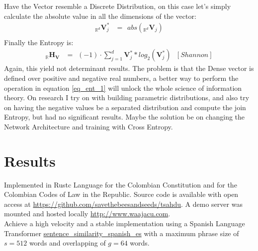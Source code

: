 \documentclass[a4paper,fleqn]{cas-sc}
\begin{document}
\noindent
Have the Vector resemble a Discrete Distribution, on this case let's simply calculate the absolute value in all the dimensions of the vector: 
\begin{equation}\label{eq_ent_1}
  \begin{split}
    {}_{\mathbb{R}^{d}}\mathbf{V}^{*}_{j}&=\hspace{5pt}abs({}_{\mathbb{R}^{d}}\mathbf{V}_{j})\\
  \end{split}
\end{equation}
Finally the Entropy is: \\
\begin{equation}
  \begin{split}
    _{\mathbb{R}}\mathbf{H}_{\mathbf{V}}&=\hspace{5pt} (-1) \cdot{}\sum_{j=1}^{d}\mathbf{V}^{*}_{j}*log_{2}(\mathbf{V}^{*}_{j})\hspace{8pt} [Shannon]  
  \end{split}
\end{equation}
Again, this yield \color{brown}not determinant results\color{black}. The problem is that the Dense vector is defined over positive and negative real numbers, 
a better way to perform the operation in equation \ref{eq_ent_1} will unlock the whole science of information theory. On research I try on with building 
parametric distributions, and also try on having the negative values be a separated distribution and compute the join Entropy, but had no significant results. 
Maybe the solution be on changing the Network Architecture and training with Cross Entropy. 

\newpage
\section{Results}
Implemented in Rustc Language for the Colombian Constitution and for the Colombian Codes of Law in the Republic. 
Source code is available with open access at \href{https://github.com/savethebeesandseeds/tsahdu}{https://github.com/savethebeesandseeds/tsahdu}. 
A demo server was mounted and hosted locally \href{http://www.waajacu.com}{http://www.waajacu.com}. \\

Achieve a high velocity and a stable implementation 
using a Spanish Language Transformer \href{https://huggingface.co/hiiamsid/sentence_similarity_spanish_es}{sentence\_similarity\_spanish\_es} 
with a maximum phrase size of $s=512$ words and overlapping of $g=64$ words.
\end{document}
